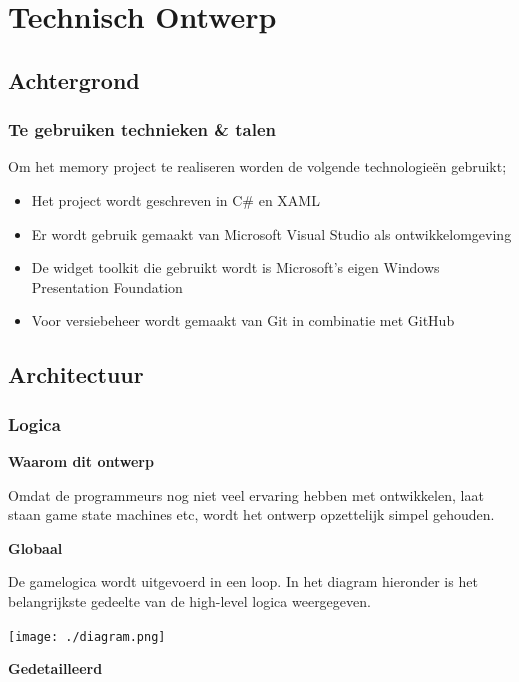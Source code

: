 \documentclass[a4paper,titlepage,11pt]{article}
\begin{document}
\clearpage

\section{Technisch Ontwerp}

\subsection{Achtergrond}

\subsubsection{Te gebruiken technieken \& talen}

Om het memory project te realiseren worden de volgende technologieën gebruikt;
\begin{itemize}
\item Het project wordt geschreven in C\# en XAML
\item Er wordt gebruik gemaakt van Microsoft Visual Studio als ontwikkelomgeving
\item De widget toolkit die gebruikt wordt is Microsoft’s eigen Windows Presentation Foundation
\item Voor versiebeheer wordt gemaakt van Git in combinatie met GitHub
\end{itemize}

\subsection{Architectuur}

\subsubsection{Logica}


{\bf Waarom dit ontwerp}

Omdat de programmeurs nog niet veel ervaring hebben met ontwikkelen, laat staan
game state machines etc, wordt het ontwerp opzettelijk simpel gehouden.

{\bf Globaal}

De gamelogica wordt uitgevoerd in een loop. 
In het diagram hieronder is het belangrijkste gedeelte
van de high-level logica weergegeven. 

\begin{center}
\texttt{[image: ./diagram.png]}
\end{center}

{\bf Gedetailleerd}
\end{document}
